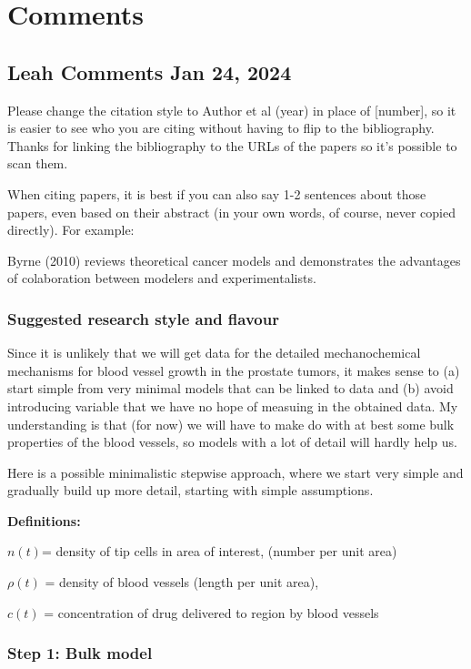 \chapter{Comments}


	
\section{Leah Comments Jan 24, 2024}
Please change the citation style to Author et al (year) in place of [number], so it is easier to see who you are citing without having to flip to the bibliography. Thanks for linking the bibliography to the URLs of the papers so it's possible to scan them.

When citing papers, it is best if you can also say 1-2 sentences about those papers, even based on their abstract (in your own words, of course, never copied directly). For example:

Byrne (2010) reviews theoretical cancer models and demonstrates the advantages of colaboration between modelers and experimentalists.

\subsection{Suggested research style and flavour}

Since it is unlikely that we will get data for the detailed mechanochemical mechanisms for blood vessel growth in the prostate tumors, it makes sense to (a) start simple from very minimal models that can be linked to data and (b) avoid introducing variable that we have no hope of measuing in the obtained data. My understanding is that (for now) we will have to make do with at best some bulk properties of the blood vessels, so models with a lot of detail will hardly help us.

Here is a possible minimalistic stepwise approach, where we start very simple and gradually build up more detail, starting with simple assumptions.

\textbf{Definitions:} 

$n(t)$= density of tip cells in area of interest, (number per unit area)

$\rho(t)$ = density of blood vessels (length per unit area),

$c(t)$ = concentration of drug delivered to region by blood vessels



\subsection{Step 1: Bulk model}

